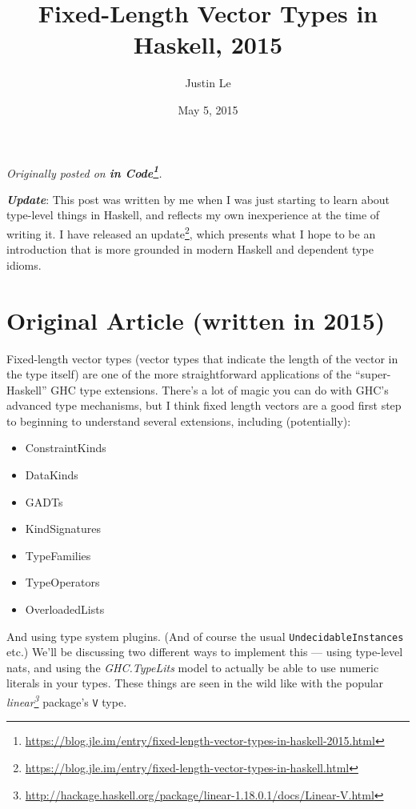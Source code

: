 \documentclass[]{article}
\title{Fixed-Length Vector Types in Haskell, 2015}
\author{Justin Le}
\date{May 5, 2015}
\renewcommand{\href}[2]{#2\footnote{\url{#1}}}
\begin{document}
\maketitle

\emph{Originally posted on
\textbf{\href{https://blog.jle.im/entry/fixed-length-vector-types-in-haskell-2015.html}{in
Code}}.}

\textbf{\emph{Update}}: This post was written by me when I was just starting to
learn about type-level things in Haskell, and reflects my own inexperience at
the time of writing it. I have
\href{https://blog.jle.im/entry/fixed-length-vector-types-in-haskell.html}{released
an update}, which presents what I hope to be an introduction that is more
grounded in modern Haskell and dependent type idioms.

\hypertarget{original-article-written-in-2015}{%
\section{Original Article (written in
2015)}\label{original-article-written-in-2015}}

Fixed-length vector types (vector types that indicate the length of the vector
in the type itself) are one of the more straightforward applications of the
``super-Haskell'' GHC type extensions. There's a lot of magic you can do with
GHC's advanced type mechanisms, but I think fixed length vectors are a good
first step to beginning to understand several extensions, including
(potentially):

\begin{itemize}
\tightlist
\item
  ConstraintKinds
\item
  DataKinds
\item
  GADTs
\item
  KindSignatures
\item
  TypeFamilies
\item
  TypeOperators
\item
  OverloadedLists
\end{itemize}

And using type system plugins. (And of course the usual
\texttt{UndecidableInstances} etc.) We'll be discussing two different ways to
implement this --- using type-level nats, and using the \emph{GHC.TypeLits}
model to actually be able to use numeric literals in your types. These things
are seen in the wild like with the popular
\emph{\href{http://hackage.haskell.org/package/linear-1.18.0.1/docs/Linear-V.html}{linear}}
package's \texttt{V} type.
\end{document}
